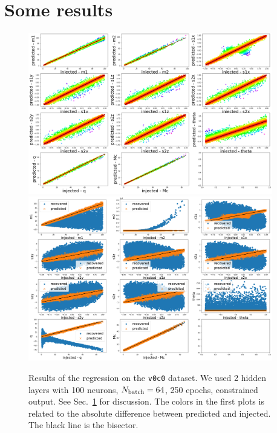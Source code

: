 \documentclass[prd,aps,twocolumn,a4paper,showkeys,nofootinbib]{article}
\begin{document}
\section{Some results}
\label{sec:some_results}
%
\begin{figure}[]
  \center
  \includegraphics[width=0.95\textwidth]{./Figs/v0c0_regression.png}
  \includegraphics[width=0.95\textwidth]{./Figs/v0c0_regression_noise.png}
  \caption{\label{fig:v0c0_results} Results of the regression on the \texttt{v0c0}
  dataset. We used 2 hidden layers with 100 neurons, $N_{\rm batch}=64$, 250 epochs,  
  constrained output. See Sec.~\ref{sec:some_results} for discussion. 
  The colors in the first plots is related to the absolute difference between predicted 
  and injected. The black line is the bisector.}
\end{figure}
%
\end{document}
